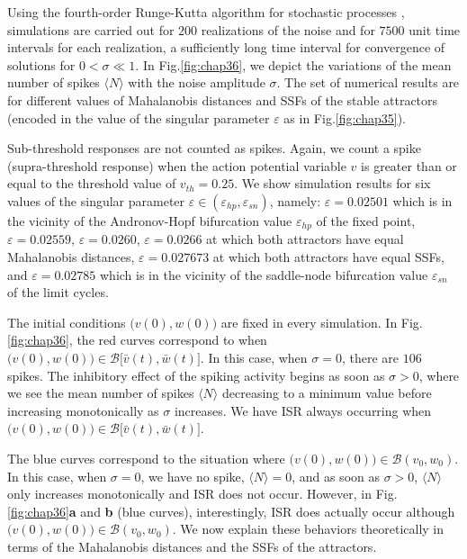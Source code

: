 Using the fourth-order
Runge-Kutta algorithm for stochastic processes
\cite{Kasdin}, simulations are carried out for $200$
realizations of the noise and for $7500$ unit time intervals for 
each realization, a sufficiently long time interval for convergence of solutions
for $0<\sigma\ll1$. In Fig.\ref{fig:chap36}, 
we depict the variations of the mean number of
spikes $\langle N\rangle$ with the noise amplitude $\sigma$. The set of
numerical results are for different values of Mahalanobis
distances and SSFs of the stable attractors (encoded in the value of the singular parameter
$\varepsilon$ as in Fig.\ref{fig:chap35}). 

Sub-threshold responses are not counted as spikes. Again, we count a spike
(supra-threshold response) when the action potential
variable $v$ is greater than or equal to the threshold value of
$v_{th}=0.25$. We show simulation results for six values of the singular parameter
$\varepsilon\in(\varepsilon_{hp},\varepsilon_{sn})$, namely:
$\varepsilon=0.02501$ which is in the vicinity of the
Andronov-Hopf bifurcation value $\varepsilon_{hp}$ of the fixed
point, $\varepsilon=0.02559$, $\varepsilon=0.0260$,  
$\varepsilon=0.0266$ at which both attractors have equal
Mahalanobis distances, $\varepsilon=0.027673$
at which both attractors have equal SSFs, and
$\varepsilon=0.02785$ which is in the vicinity of the saddle-node
bifurcation value $\varepsilon_{sn}$ of the limit cycles.

The initial conditions $\big(v(0),w(0)\big)$ are fixed in every simulation. In Fig.\ref{fig:chap36}, the
red curves correspond to when $\big(v(0),w(0)\big)\in\mathcal{B}\big[\bar{v}(t),\bar{w}(t)\big]$. 
In this case, when $\sigma=0$, there
are $106$ spikes. The inhibitory effect of the spiking activity
begins as soon as $\sigma>0$, where we see the mean number of
spikes $\langle N\rangle$ decreasing to a minimum value before increasing
monotonically as $\sigma$ increases. We have ISR always occurring when 
$\big(v(0),w(0)\big)\in\mathcal{B}\big[\bar{v}(t),\bar{w}(t)\big]$.

The blue curves correspond to the situation where
$\big(v(0),w(0)\big)\in\mathcal{B}(v_0,w_0)$. In this case, when
$\sigma=0$, we have no spike, $\langle N\rangle=0$, and as soon as $\sigma>0$, 
$\langle N\rangle$ only increases monotonically and ISR does not occur. However, in
Fig.\ref{fig:chap36}\textbf{a} and \textbf{b} (blue curves), interestingly, ISR does actually occur
although $\big(v(0),w(0)\big)\in\mathcal{B}(v_0,w_0)$. 
We now  explain
these behaviors theoretically in terms of the Mahalanobis distances and the
SSFs of the attractors.


